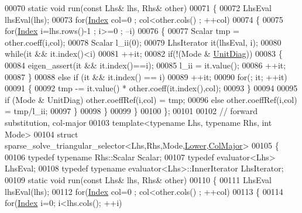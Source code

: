 \begin{DoxyCode}
00070   \textcolor{keyword}{static} \textcolor{keywordtype}{void} run(\textcolor{keyword}{const} Lhs& lhs, Rhs& other)
00071   \{
00072     LhsEval lhsEval(lhs);
00073     \textcolor{keywordflow}{for}(\hyperlink{namespace_eigen_a62e77e0933482dafde8fe197d9a2cfde}{Index} col=0 ; col<other.cols() ; ++col)
00074     \{
00075       \textcolor{keywordflow}{for}(\hyperlink{namespace_eigen_a62e77e0933482dafde8fe197d9a2cfde}{Index} i=lhs.rows()-1 ; i>=0 ; --i)
00076       \{
00077         Scalar tmp = other.coeff(i,col);
00078         Scalar l\_ii(0);
00079         LhsIterator it(lhsEval, i);
00080         \textcolor{keywordflow}{while}(it && it.index()<i)
00081           ++it;
00082         \textcolor{keywordflow}{if}(!(Mode & \hyperlink{group__enums_gga39e3366ff5554d731e7dc8bb642f83cdaddb72f888ac85d5a1c52333e54f9374b}{UnitDiag}))
00083         \{
00084           eigen\_assert(it && it.index()==i);
00085           l\_ii = it.value();
00086           ++it;
00087         \}
00088         \textcolor{keywordflow}{else} \textcolor{keywordflow}{if} (it && it.index() == i)
00089           ++it;
00090         \textcolor{keywordflow}{for}(; it; ++it)
00091         \{
00092           tmp -= it.value() * other.coeff(it.index(),col);
00093         \}
00094 
00095         \textcolor{keywordflow}{if} (Mode & UnitDiag)  other.coeffRef(i,col) = tmp;
00096         \textcolor{keywordflow}{else}                  other.coeffRef(i,col) = tmp/l\_ii;
00097       \}
00098     \}
00099   \}
00100 \};
00101 
00102 \textcolor{comment}{// forward substitution, col-major}
00103 \textcolor{keyword}{template}<\textcolor{keyword}{typename} Lhs, \textcolor{keyword}{typename} Rhs, \textcolor{keywordtype}{int} Mode>
00104 \textcolor{keyword}{struct }sparse\_solve\_triangular\_selector<Lhs,Rhs,Mode,\hyperlink{group__enums_gga39e3366ff5554d731e7dc8bb642f83cda891792b8ed394f7607ab16dd716f60e6}{Lower},\hyperlink{group__enums_ggaacded1a18ae58b0f554751f6cdf9eb13a0cbd4bdd0abcfc0224c5fcb5e4f6669a}{ColMajor}>
00105 \{
00106   \textcolor{keyword}{typedef} \textcolor{keyword}{typename} Rhs::Scalar Scalar;
00107   \textcolor{keyword}{typedef} evaluator<Lhs> LhsEval;
00108   \textcolor{keyword}{typedef} \textcolor{keyword}{typename} evaluator<Lhs>::InnerIterator LhsIterator;
00109   \textcolor{keyword}{static} \textcolor{keywordtype}{void} run(\textcolor{keyword}{const} Lhs& lhs, Rhs& other)
00110   \{
00111     LhsEval lhsEval(lhs);
00112     \textcolor{keywordflow}{for}(\hyperlink{namespace_eigen_a62e77e0933482dafde8fe197d9a2cfde}{Index} col=0 ; col<other.cols() ; ++col)
00113     \{
00114       \textcolor{keywordflow}{for}(\hyperlink{namespace_eigen_a62e77e0933482dafde8fe197d9a2cfde}{Index} i=0; i<lhs.cols(); ++i)

\end{DoxyCode}
